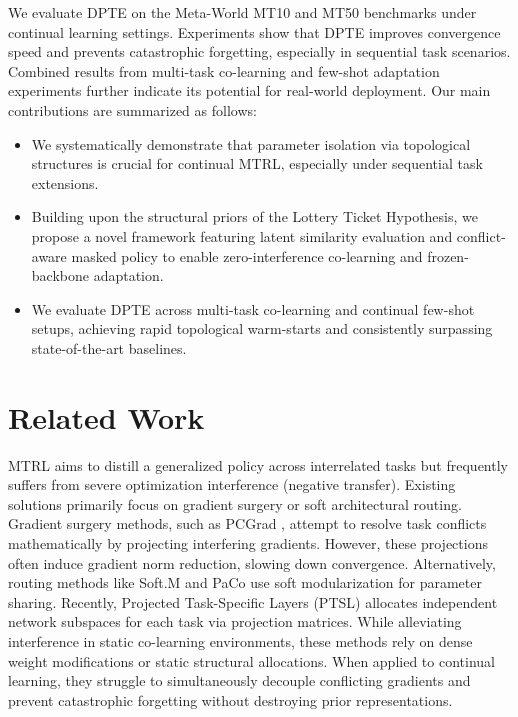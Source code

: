 \documentclass{article}
\begin{document}
We evaluate DPTE on the Meta-World MT10 and MT50 benchmarks \cite{q15} under continual learning settings. 
Experiments show that DPTE improves convergence speed and prevents catastrophic forgetting, especially in sequential task scenarios. 
Combined results from multi-task co-learning and few-shot adaptation experiments further indicate its potential for real-world deployment.
Our main contributions are summarized as follows:
\begin{itemize}
\item We systematically demonstrate that parameter isolation via topological structures is crucial for continual MTRL, especially under sequential task extensions.
\item Building upon the structural priors of the Lottery Ticket Hypothesis, we propose a novel framework featuring latent similarity evaluation and conflict-aware masked policy to enable zero-interference co-learning and frozen-backbone adaptation.
\item We evaluate DPTE across multi-task co-learning and continual few-shot setups, achieving rapid topological warm-starts and consistently surpassing state-of-the-art baselines.
\end{itemize}



\section{Related Work}

MTRL aims to distill a generalized policy across interrelated tasks but frequently suffers from severe optimization interference (negative transfer). 
Existing solutions primarily focus on gradient surgery or soft architectural routing. 
Gradient surgery methods, such as PCGrad \cite{i14}, attempt to resolve task conflicts mathematically by projecting interfering gradients. However, these projections often induce gradient norm reduction, slowing down convergence. 
Alternatively, routing methods like Soft.M \cite{q51} and PaCo \cite{q36} use soft modularization for parameter sharing. 
Recently, Projected Task-Specific Layers (PTSL) \cite{q43} allocates independent network subspaces for each task via projection matrices. 
While alleviating interference in static co-learning environments, these methods rely on dense weight modifications or static structural allocations. 
When applied to continual learning, they struggle to simultaneously decouple conflicting gradients and prevent catastrophic forgetting without destroying prior representations.
\end{document}
